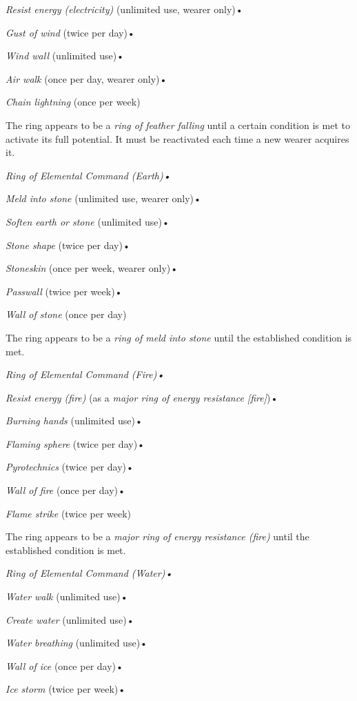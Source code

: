 \documentclass{article}
\begin{document}
\textit{Resist energy (electricity) }(unlimited use, wearer only)• 

\textit{Gust of wind }(twice per day)• 

\textit{Wind wall }(unlimited use)• 

\textit{Air walk }(once per day, wearer only)• 

\textit{Chain lightning }(once per week)

The ring appears to be a \textit{ring of feather falling }until a certain condition 
is met to activate its full potential. It must be reactivated each time a new wearer 
acquires it.

\textit{Ring of Elemental Command (Earth)• }

\textit{Meld into stone }(unlimited use, wearer only)• 

\textit{Soften earth or stone }(unlimited use)• 

\textit{Stone shape }(twice per day)• 

\textit{Stoneskin }(once per week, wearer only)• 

\textit{Passwall }(twice per week)• 

\textit{Wall of stone }(once per day)

The ring appears to be a \textit{ring of meld into stone }until the established 
condition is met.

\textit{Ring of Elemental Command (Fire)• }

\textit{Resist energy (fire) }(as a \textit{major ring of energy resistance [fire]})• 

\textit{Burning hands }(unlimited use)• 

\textit{Flaming sphere }(twice per day)• 

\textit{Pyrotechnics }(twice per day)• 

\textit{Wall of fire }(once per day)• 

\textit{Flame strike }(twice per week)

The ring appears to be a \textit{major ring of energy resistance (fire) }until 
the established condition is met.

\textit{Ring of Elemental Command (Water)• }

\textit{Water walk }(unlimited use)• 

\textit{Create water }(unlimited use)• 

\textit{Water breathing }(unlimited use)• 

\textit{Wall of ice }(once per day)• 

\textit{Ice storm }(twice per week)• 
\end{document}
